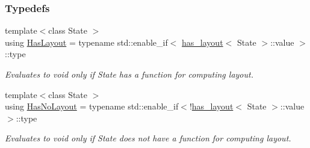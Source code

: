 \subsubsection*{Typedefs}
\begin{DoxyCompactItemize}
\item 
{\footnotesize template$<$class State $>$ }\\using \hyperlink{namespaceslb_1_1core_1_1ui_a9bf16cc2a70201a2d10994dbffbe094f}{Has\+Layout} = typename std\+::enable\+\_\+if$<$ \hyperlink{structslb_1_1core_1_1ui_1_1has__layout}{has\+\_\+layout}$<$ State $>$\+::value $>$\+::type\hypertarget{namespaceslb_1_1core_1_1ui_a9bf16cc2a70201a2d10994dbffbe094f}{}\label{namespaceslb_1_1core_1_1ui_a9bf16cc2a70201a2d10994dbffbe094f}

\begin{DoxyCompactList}\small\item\em Evaluates to {\ttfamily void} only if {\ttfamily State} has a function for computing layout. \end{DoxyCompactList}\item 
{\footnotesize template$<$class State $>$ }\\using \hyperlink{namespaceslb_1_1core_1_1ui_af200efa9fbb401dd541fa80e687e0264}{Has\+No\+Layout} = typename std\+::enable\+\_\+if$<$!\hyperlink{structslb_1_1core_1_1ui_1_1has__layout}{has\+\_\+layout}$<$ State $>$\+::value $>$\+::type\hypertarget{namespaceslb_1_1core_1_1ui_af200efa9fbb401dd541fa80e687e0264}{}\label{namespaceslb_1_1core_1_1ui_af200efa9fbb401dd541fa80e687e0264}

\begin{DoxyCompactList}\small\item\em Evaluates to {\ttfamily void} only if {\ttfamily State} does not have a function for computing layout. \end{DoxyCompactList}\end{DoxyCompactItemize}
